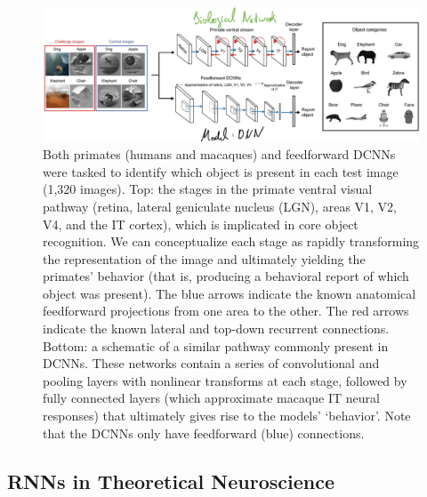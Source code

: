 \documentclass[main]{subfiles}
\begin{document}
\begin{figure}[H]
    \centering
    \includegraphics[width=0.99\linewidth]{13_LearningInRecurrentNeuronalNetworks/figures/primate_recognition.png}
    \caption{Both primates (humans and macaques) and feedforward DCNNs were tasked to identify which object is present in each test image (1,320 images). Top: the stages in the primate ventral visual pathway (retina, lateral geniculate nucleus (LGN), areas V1, V2, V4, and the IT cortex), which is implicated in core object recognition. We can conceptualize each stage as rapidly transforming the representation of the image and ultimately yielding the primates’ behavior (that is, producing a behavioral report of which object was present). The blue arrows indicate the known anatomical feedforward projections from one area to the other. The red arrows indicate the known lateral and top-down recurrent connections. Bottom: a schematic of a similar pathway commonly present in DCNNs. These networks contain a series of convolutional and pooling layers with nonlinear transforms at each stage, followed by fully connected layers (which approximate macaque IT neural responses) that ultimately gives rise to the models’ ‘behavior’. Note that the DCNNs only have feedforward (blue) connections.}
    \label{fig:lstm_many}
\end{figure}


\subsection{RNNs in Theoretical Neuroscience}
\end{document}
